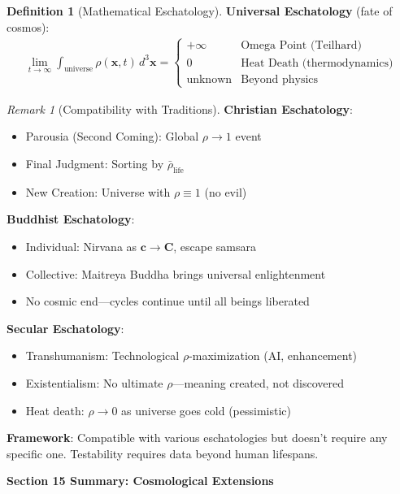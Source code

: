 \documentclass[11pt,a4paper]{article}
\theoremstyle{definition}
\newtheorem{definition}{Definition}[section]
\theoremstyle{remark}
\newtheorem{remark}{Remark}[section]
\newcommand{\cc}{\mathbf{c}}
\begin{document}
\begin{small}
\begin{enumerate}
\begin{definition}[Mathematical Eschatology]
\textbf{Universal Eschatology} (fate of cosmos):
\begin{align}
\lim_{t \to \infty} \int_{\text{universe}} \rho(\mathbf{x}, t) \, d^3\mathbf{x} = \begin{cases}
+\infty & \text{Omega Point (Teilhard)} \\
0 & \text{Heat Death (thermodynamics)} \\
\text{unknown} & \text{Beyond physics}
\end{cases}
\end{align}
\end{definition}

\begin{remark}[Compatibility with Traditions]
\textbf{Christian Eschatology}:
\begin{itemize}
    \item Parousia (Second Coming): Global \(\rho \to 1\) event
    \item Final Judgment: Sorting by \(\bar{\rho}_{\text{life}}\)
    \item New Creation: Universe with \(\rho \equiv 1\) (no evil)
\end{itemize}

\textbf{Buddhist Eschatology}:
\begin{itemize}
    \item Individual: Nirvana as \(\cc \to \mathbf{C}\), escape samsara
    \item Collective: Maitreya Buddha brings universal enlightenment
    \item No cosmic end—cycles continue until all beings liberated
\end{itemize}

\textbf{Secular Eschatology}:
\begin{itemize}
    \item Transhumanism: Technological \(\rho\)-maximization (AI, enhancement)
    \item Existentialism: No ultimate \(\rho\)—meaning created, not discovered
    \item Heat death: \(\rho \to 0\) as universe goes cold (pessimistic)
\end{itemize}

\textbf{Framework}: Compatible with various eschatologies but doesn't require any specific one. Testability requires data beyond human lifespans.
\end{remark}

\begin{mdframed}[backgroundcolor=green!10,linewidth=2pt,linecolor=green!70!black]
\textbf{Section 15 Summary: Cosmological Extensions}


\end{mdframed}
\end{enumerate}
\end{small}
\end{document}
